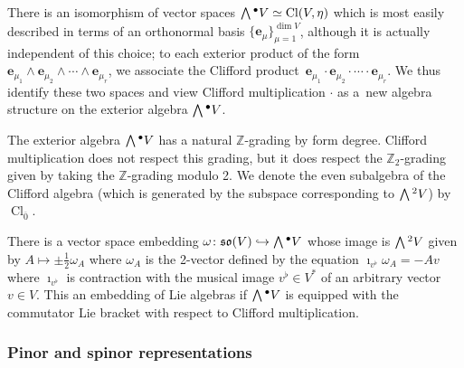 \documentclass[11pt]{article}
\numberwithin{equation}{section}
\numberwithin{equation}{section}
\newcommand{\fso}{\mathfrak{so}}
\newcommand{\ZZ}{\mathbb{Z}}
\newcommand{\Wedge}{\mathchoice{{\textstyle\bigwedge}}{\bigwedge}{\bigwedge}{\bigwedge}}	%
\newcommand{\be}{\boldsymbol{e}}
\newcommand{\1}{\mathbbm{1}}
\DeclareMathOperator{\Cl}{Cl}
\begin{document}
There is an isomorphism of vector spaces $\Wedge^\bullet V\simeq \Cl(V,\eta)$ which is most easily described in terms of an orthonormal basis $\{\be_\mu\}_{\mu=1}^{\dim V}$, although it is actually independent of this choice; to each exterior product of the form $\be_{\mu_1}\wedge\be_{\mu_2}\wedge\cdots\wedge\be_{\mu_r}$, we associate the Clifford product~${\be_{\mu_1}\cdot\be_{\mu_2}\cdot\cdots\cdot\be_{\mu_r}}$. We thus identify these two spaces and view Clifford multiplication $\cdot$ as a~new algebra structure on the exterior algebra $\Wedge^\bullet V$.

The exterior algebra $\Wedge^\bullet V$ has a natural $\ZZ$-grading by form degree. Clifford multiplication does not respect this grading, but it does respect the $\ZZ_2$-grading given by taking the $\ZZ$-grading modulo 2. We denote the even subalgebra of the Clifford algebra \big(which is generated by the subspace corresponding to $\Wedge^2 V$\big) by $\Cl_{\overline0}$.

There is a vector space embedding $\omega\colon\fso(V)\hookrightarrow\Wedge^\bullet V$ whose image is $\Wedge^2 V$ given by $A\mapsto \pm\frac{1}{2}\omega_A$ where $\omega_A$ is the 2-vector defined by the equation
$\imath_{v^\flat}\omega_A = -Av
$
where $\imath_{v^\flat}$ is contraction with the musical image $v^\flat\in V^*$ of an arbitrary vector $v\in V$.
This an embedding of Lie algebras if $\Wedge^\bullet V$ is equipped with the commutator Lie bracket with respect to Clifford multiplication.

\subsubsection{Pinor and spinor representations}
\label{sec:pinor-spinor}
\end{document}
